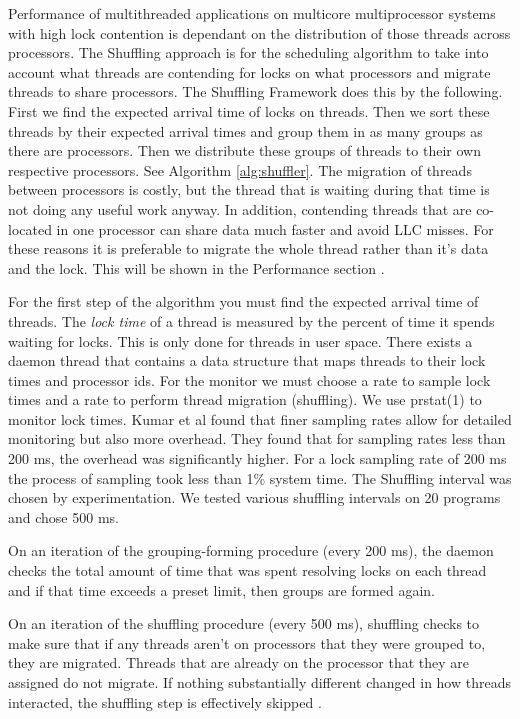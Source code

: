 \documentclass{sig-alternate}
\begin{document}
Performance of multithreaded applications on multicore multiprocessor systems with high lock contention is dependant on the distribution of those threads across processors. The Shuffling approach is for the scheduling algorithm to take into account what threads are contending for locks on what processors and migrate threads to share processors. The Shuffling Framework does this by the following. First we find the expected arrival time of locks on threads. Then we sort these threads by their expected arrival times and group them in as many groups as there are processors. Then we distribute these groups of threads to their own respective processors. See Algorithm \ref{alg:shuffler}. The migration of threads between processors is costly, but the thread that is waiting during that time is not doing any useful work anyway. In addition, contending threads that are co-located in one processor can share data much faster and avoid LLC misses. For these reasons it is preferable to migrate the whole thread rather than it's data and the lock. This will be shown in the Performance section \cite{KumarEtal:2014}.

For the first step of the algorithm you must find the expected arrival time of threads. The \textit{lock time} of a thread is measured by the percent of time it spends waiting for locks. This is only done for threads in user space. There exists a daemon thread that contains a data structure that maps threads to their lock times and processor ids. For the monitor we must choose a rate to sample lock times and a rate to perform thread migration (shuffling). We use prstat(1) to monitor lock times. Kumar et al found that finer sampling rates allow for detailed monitoring but also more overhead. They found that for sampling rates less than 200 ms, the overhead was significantly higher. For a lock sampling rate of 200 ms the process of sampling took less than 1\% system time. The Shuffling interval was chosen by experimentation. We tested various shuffling intervals on 20 programs and chose 500 ms.

On an iteration of the grouping-forming procedure (every 200 ms), the daemon checks the total amount of time that was spent resolving locks on each thread and if that time exceeds a preset limit, then groups are formed again.

On an iteration of the shuffling procedure (every 500 ms), shuffling checks to make sure that if any threads aren't on processors that they were grouped to, they are migrated. Threads that are already on the processor that they are assigned do not migrate. If nothing substantially different changed in how threads interacted, the shuffling step is effectively skipped \cite{KumarEtal:2014}.
\end{document}
